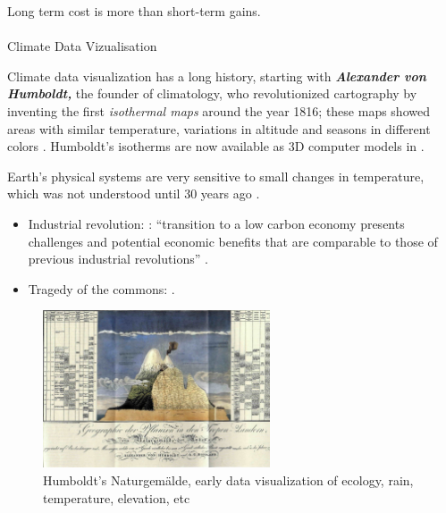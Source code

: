 \documentclass[
  letterpaper,
  DIV=11,
  numbers=noendperiod]{scrartcl}
\makeatletter
\let\oldparagraph\paragraph
\renewcommand{\paragraph}{
    \@ifstar
      \xxxParagraphStar
      \xxxParagraphNoStar
  }
\newcommand{\xxxParagraphStar}[1]{\oldparagraph*{#1}\mbox{}}
\newcommand{\xxxParagraphNoStar}[1]{\oldparagraph{#1}\mbox{}}
\providecommand{\tightlist}{%
  \setlength{\itemsep}{0pt}\setlength{\parskip}{0pt}}\usepackage{longtable,booktabs,array}
\makeatother
\begin{document}
Long term cost is more than short-term gains.

\paragraph{Climate Data Vizualisation}\label{climate-data-vizualisation}

Climate data visualization has a long history, starting with
\textbf{\emph{Alexander von Humboldt,}} the founder of climatology, who
revolutionized cartography by inventing the first \emph{isothermal maps}
around the year 1816; these maps showed areas with similar temperature,
variations in altitude and seasons in different colors
\citep{hontonForgottenFatherClimatology2022}. Humboldt's isotherms are
now available as 3D computer models in \citep{IsothermsSimplyEarth2023}.

Earth's physical systems are very sensitive to small changes in
temperature, which was not understood until 30 years ago
\citep{mckibbenEndNature2006}.

\begin{itemize}
\tightlist
\item
  Industrial revolution: : ``transition to a low carbon economy presents
  challenges and potential economic benefits that are comparable to
  those of previous industrial revolutions''
  \citep{pearsonLowCarbonIndustrial2012}.
\item
  Tragedy of the commons:
  \citep{meisingerTragedyIntangibleCommons2022, lopezClimateChangeTimes2022, muraseSevenRulesAvoid2018}.
\end{itemize}

\begin{figure}[H]

{\centering \includegraphics[width=0.6\textwidth,height=\textheight]{./images/humboldt.jpg}

}

\caption{Humboldt's Naturgemälde, early data visualization of ecology,
rain, temperature, elevation, etc}

\end{figure}%
\end{document}

